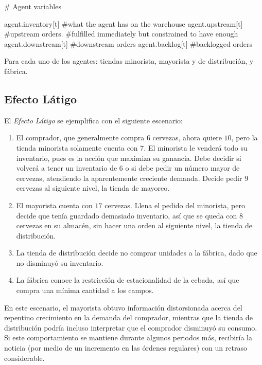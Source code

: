 # Agent variables

agent.inventory[t]  #what the agent has on the warehouse
agent.upstream[t]   #upstream orders.
                    #fulfilled immediately but constrained to have enough
agent.downstream[t] #downstream orders
agent.backlog[t]    #backlogged orders


Para cada uno de los agentes: tiendas minorista, mayorista y de distribución, y fábrica.\\


\subsection{Efecto Látigo}

El \textit{Efecto Látigo} se ejemplifica con el siguiente escenario:


\begin{enumerate}
    \item El comprador, que generalmente compra $6$ cervezas, ahora quiere $10$, pero la tienda minorista solamente cuenta con $7$. El minorista le venderá todo su inventario, pues es la acci\'on que maximiza su ganancia. Debe decidir si volverá a tener un inventario de $6$ o si debe pedir un número mayor de cervezas, atendiendo la aparentemente creciente demanda. Decide pedir $9$ cervezas al siguiente nivel, la tienda de mayoreo.
    \item El mayorista cuenta con $17$ cervezas. Llena el pedido del minorista, pero decide que ten\'ia guardado demasiado inventario, as\'i que se queda con $8$ cervezas en su almac\'en, sin hacer una orden al siguiente nivel, la tienda de distribución.
    \item La tienda de distribuci\'on decide no comprar unidades a la f\'abrica, dado que no disminuy\'o su inventario.
    \item La f\'abrica conoce la restricci\'on de estacionalidad de la cebada, as\'i que compra una m\'inima cantidad a los campos.
\end{enumerate}

En este escenario, el mayorista obtuvo informaci\'on distorsionada acerca del repentino crecimiento en la demanda del comprador, mientras que la tienda de distribución podr\'ia incluso interpretar que el comprador disminuy\'o su consumo. Si este comportamiento se mantiene durante algunos periodos más, recibiría la noticia (por medio de un incremento en las órdenes regulares) con un retraso considerable.\\

